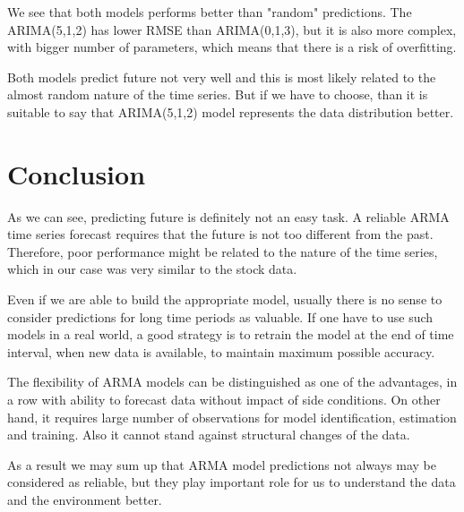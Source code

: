 \documentclass[14pt,a4paper]{extarticle}
\newcounter{e}
\newcounter{tabl}
\numberwithin{equation}{section}
\numberwithin{figure}{section}
\begin{document}
We see that both models performs better than "random" predictions.
The ARIMA(5,1,2) has lower RMSE than ARIMA(0,1,3), but it is also more complex, with bigger number of parameters, which means that there is a risk of overfitting.

Both models predict future not very well and this is most likely related to the almost random nature of the time series. But if we have to choose, than it is suitable to say that ARIMA(5,1,2) model represents the data distribution better.

\section{Conclusion}
As we can see, predicting future is definitely not an easy task.
A reliable ARMA time series forecast requires that the future is not
too different from the past. Therefore, poor performance might be related to the nature of the time series, which in our case was very similar to the stock data.

Even if we are able to build the appropriate model, usually there is no sense to consider predictions for long time periods as valuable. If one have to use such models in a real world, a good strategy is to retrain the model at the end of time interval, when new data is available, to maintain maximum possible accuracy.

The flexibility of ARMA models can be distinguished as one of the advantages, in a row with ability to forecast data without impact of side conditions. On other hand, it requires large number of observations for model identification, estimation and training. Also it cannot stand against structural changes of the data.

As a result we may sum up that ARMA model predictions not always may be considered as reliable, but they play important role for us to understand the data and the environment better.
\end{document}
